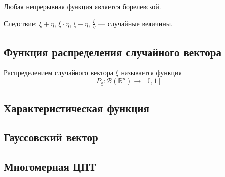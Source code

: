 Любая непрерывная функция является борелевской.

Следствие: $\xi+\eta$, $\xi \cdot \eta$, $\xi-\eta$, $\frac{\xi}{\eta}$ --- случайные величины.

\subsection{Функция распределения случайного вектора}

\begin{definition}
    Распределением случайного вектора $\xi$ называется функция 
    \begin{equation}
        P_\xi : \mathcal{B} (\mathbb{R}^n) \rightarrow [0,1]
    \end{equation}
\end{definition}

\subsection{Характеристическая функция}

\subsection{Гауссовский вектор}

\subsection{Многомерная ЦПТ}

\newpage